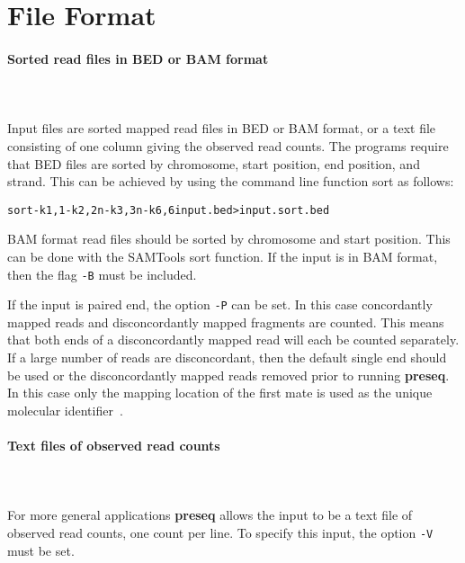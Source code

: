 \documentclass[11pt, titlepage]{article}
\newcommand{\fn}[1]{\texttt{#1}}
\begin{document}
\newpage

\section{File Format}
\label{sec:format}

\paragraph{Sorted read files in BED or BAM format}~\\~\\[-.2cm]
Input files are sorted mapped read files in BED or BAM format,
or a text file consisting of one column giving the observed read counts.
The
programs require that BED files are sorted by chromosome,
start position, end position, and strand.  This can be achieved
by using the command line function sort as follows:
\begingroup \fontsize{9pt}{12pt}\selectfont \begin{alltt}
sort -k 1,1 -k 2,2n -k 3,3n -k 6,6 input.bed > input.sort.bed
\end{alltt}\endgroup
BAM format read files should be sorted by chromosome and
start position.  This can be done with the SAMTools
sort function. If the input is in BAM format, then the flag
\fn{-B} must be included.


If the input is paired end, the option \fn{-P} can be set.
In this case concordantly mapped reads and disconcordantly
mapped fragments are counted.  This means that both ends
of a disconcordantly mapped read will each be counted separately.
If a large number of reads are disconcordant, then
the default single end should be used or the disconcordantly
mapped reads removed prior to running \textbf{preseq}.
In this case only the mapping
location of the first mate
is used as the unique molecular identifier~\cite{kivioja2011counting}.



\paragraph{Text files of observed read counts}~\\~\\[-.2cm]
For more general applications \textbf{preseq} allows the input
to be a text file of observed read counts, one count per
line.   To specify this input, the option \fn{-V} must be set.
\end{document}
